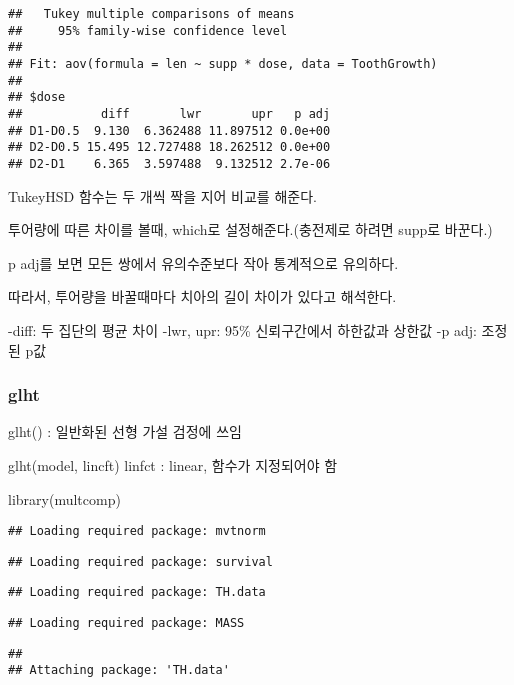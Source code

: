 \documentclass[
]{article}
\newenvironment{Shaded}{\begin{snugshade}}{\end{snugshade}}
\newcommand{\FunctionTok}[1]{\textcolor[rgb]{0.00,0.00,0.00}{#1}}
\newcommand{\NormalTok}[1]{#1}
\begin{document}
\begin{verbatim}
##   Tukey multiple comparisons of means
##     95% family-wise confidence level
## 
## Fit: aov(formula = len ~ supp * dose, data = ToothGrowth)
## 
## $dose
##           diff       lwr       upr   p adj
## D1-D0.5  9.130  6.362488 11.897512 0.0e+00
## D2-D0.5 15.495 12.727488 18.262512 0.0e+00
## D2-D1    6.365  3.597488  9.132512 2.7e-06
\end{verbatim}

TukeyHSD 함수는 두 개씩 짝을 지어 비교를 해준다.

투어량에 따른 차이를 볼때, which로 설정해준다.(충전제로 하려면 supp로 바꾼다.)

p adj를 보면 모든 쌍에서 유의수준보다 작아 통계적으로 유의하다.

따라서, 투어량을 바꿀때마다 치아의 길이 차이가 있다고 해석한다.

-diff: 두 집단의 평균 차이
-lwr, upr: 95\% 신뢰구간에서 하한값과 상한값
-p adj: 조정된 p값

\hypertarget{glht}{%
\subsubsection{glht}\label{glht}}

glht() : 일반화된 선형 가설 검정에 쓰임

glht(model, lincft)
linfct : linear, 함수가 지정되어야 함

\begin{Shaded}
\begin{Highlighting}[]
\FunctionTok{library}\NormalTok{(multcomp)}
\end{Highlighting}
\end{Shaded}

\begin{verbatim}
## Loading required package: mvtnorm
\end{verbatim}

\begin{verbatim}
## Loading required package: survival
\end{verbatim}

\begin{verbatim}
## Loading required package: TH.data
\end{verbatim}

\begin{verbatim}
## Loading required package: MASS
\end{verbatim}

\begin{verbatim}
## 
## Attaching package: 'TH.data'
\end{verbatim}
\end{document}

